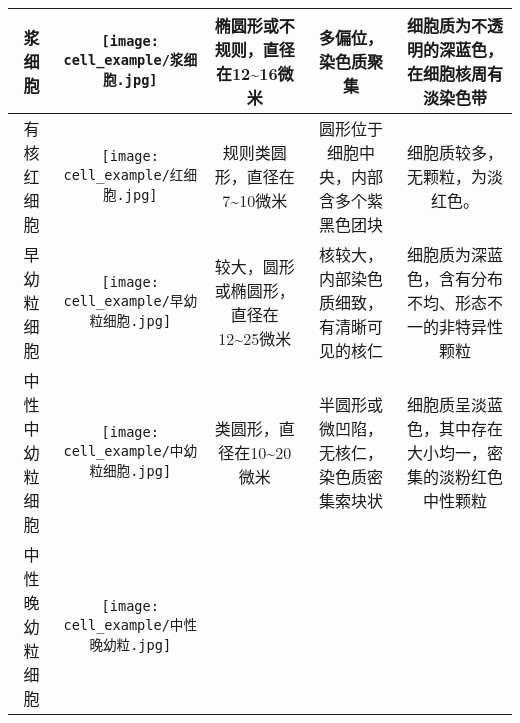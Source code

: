 \begin{longtable}{ccccc}
  \midrule[0.5pt]
  浆细胞 & 
  \multicolumn{1}{m{0.15\textwidth}}{
  \begin{minipage}[b]{0.15\textwidth}
      \centering
      {\texttt{[image: cell\_example/浆细胞.jpg]}}
  \end{minipage}} &  
  \multicolumn{1}{m{0.15\textwidth}}{椭圆形或不规则，直径在12\textasciitilde16微米} & 
  \multicolumn{1}{m{0.20\textwidth}}{多偏位，染色质聚集} & 
  \multicolumn{1}{m{0.20\textwidth}}{细胞质为不透明的深蓝色，在细胞核周有淡染色带}\\
  \midrule[0.5pt]
  有核红细胞 & 
  \multicolumn{1}{m{0.15\textwidth}}{
  \begin{minipage}[b]{0.15\textwidth}
      \centering
      {\texttt{[image: cell\_example/红细胞.jpg]}}
  \end{minipage}} &  
  \multicolumn{1}{m{0.15\textwidth}}{规则类圆形，直径在7\textasciitilde10微米} & 
  \multicolumn{1}{m{0.20\textwidth}}{圆形位于细胞中央，内部含多个紫黑色团块} & 
  \multicolumn{1}{m{0.20\textwidth}}{细胞质较多，无颗粒，为淡红色。}\\
  \midrule[0.5pt]
  早幼粒细胞 & 
  \multicolumn{1}{m{0.15\textwidth}}{
  \begin{minipage}[b]{0.15\textwidth}
      \centering
      {\texttt{[image: cell\_example/早幼粒细胞.jpg]}}
  \end{minipage}} &  
  \multicolumn{1}{m{0.15\textwidth}}{较大，圆形或椭圆形，直径在12\textasciitilde25微米} & 
  \multicolumn{1}{m{0.20\textwidth}}{核较大，内部染色质细致，有清晰可见的核仁} & 
  \multicolumn{1}{m{0.20\textwidth}}{细胞质为深蓝色，含有分布不均、形态不一的非特异性颗粒}\\
  \midrule[0.5pt]
  中性中幼粒细胞 & 
  \multicolumn{1}{m{0.15\textwidth}}{
  \begin{minipage}[b]{0.15\textwidth}
      \centering
      {\texttt{[image: cell\_example/中幼粒细胞.jpg]}}
  \end{minipage}} &  
  \multicolumn{1}{m{0.15\textwidth}}{类圆形，直径在10\textasciitilde20微米} & 
  \multicolumn{1}{m{0.20\textwidth}}{半圆形或微凹陷，无核仁，染色质密集索块状} & 
  \multicolumn{1}{m{0.20\textwidth}}{细胞质呈淡蓝色，其中存在大小均一，密集的淡粉红色中性颗粒}\\
  \midrule[0.5pt]
  中性晚幼粒细胞 & 
  \multicolumn{1}{m{0.15\textwidth}}{
  \begin{minipage}[b]{0.15\textwidth}
      \centering
      {\texttt{[image: cell\_example/中性晚幼粒.jpg]}}

\end{minipage}}
\end{longtable}

